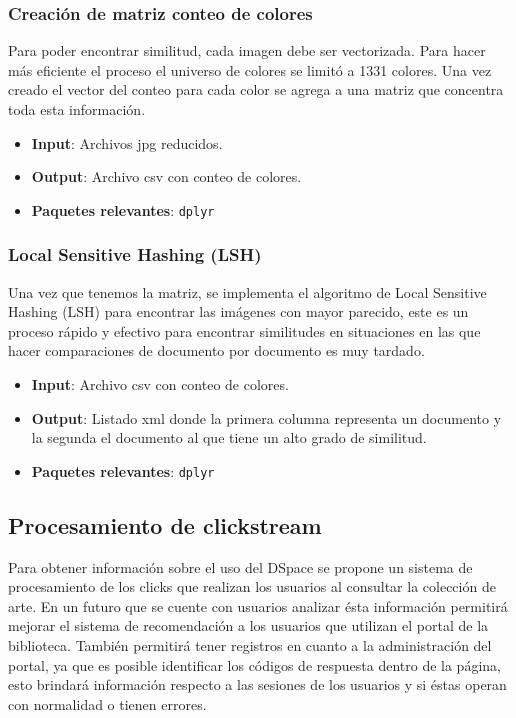 \subsubsection{ Creación de matriz conteo de colores}

Para poder encontrar similitud, cada imagen debe ser vectorizada. Para hacer más eficiente el proceso el universo de colores se limitó a 1331 colores. Una vez creado el  vector del conteo para cada color  se  agrega a una matriz que concentra toda esta información.

\begin{itemize}
\item \textbf{Input}: Archivos jpg reducidos.
\item \textbf{Output}: Archivo csv con conteo de colores.
\item \textbf{Paquetes relevantes}: \texttt{dplyr}
\end{itemize}

\subsubsection{ Local Sensitive Hashing (LSH)}
Una vez que tenemos la matriz, se implementa el algoritmo de Local Sensitive Hashing (LSH) para encontrar las imágenes con mayor parecido, este es un proceso rápido y efectivo para encontrar similitudes en situaciones en las que hacer comparaciones de documento por documento es muy tardado.

\begin{itemize}
\item \textbf{Input}: Archivo csv con conteo de colores.
\item \textbf{Output}: Listado xml donde la primera columna representa un documento y la segunda el documento al que tiene un alto grado de similitud.
\item \textbf{Paquetes relevantes}: \texttt{dplyr}
\end{itemize}




\subsection{Procesamiento de clickstream}

Para obtener información sobre el uso del DSpace  se propone un sistema de procesamiento de los clicks que realizan los usuarios al consultar la colección de arte. En un futuro que se cuente con usuarios analizar ésta información permitirá mejorar el sistema de recomendación a los usuarios que utilizan el portal de la biblioteca. También permitirá tener registros en cuanto a la administración del portal, ya que  es posible identificar los códigos de respuesta dentro de la página, esto brindará información respecto a las sesiones de los usuarios y si éstas operan con normalidad o tienen  errores.

